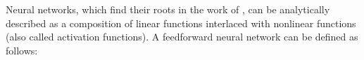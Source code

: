 %


Neural networks, which find their roots in the work of \citet{mcculloch1943logical,rosenblatt1958perceptron}, can be analytically described as a composition of linear functions interlaced with nonlinear functions (also called activation functions).
A feedforward neural network can be defined as follows:

